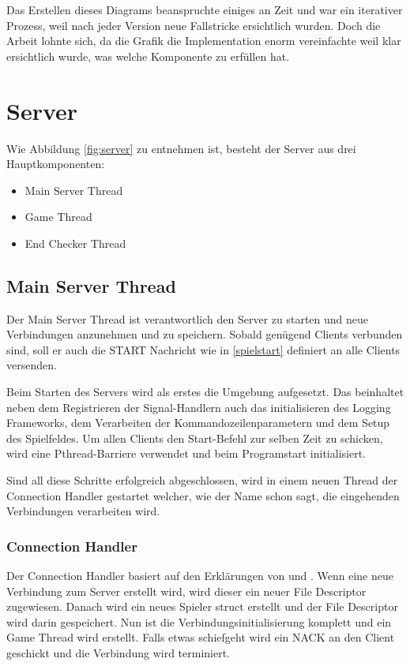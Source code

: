 Das Erstellen dieses Diagrams beanspruchte einiges an Zeit und war ein iterativer Prozess, weil nach jeder Version neue Fallstricke ersichtlich wurden. Doch die Arbeit lohnte sich, da die Grafik die Implementation enorm vereinfachte weil klar ersichtlich wurde, was welche Komponente zu erfüllen hat.

\section{Server}
Wie Abbildung \ref{fig:server} zu entnehmen ist, besteht der Server aus drei Hauptkomponenten:
\begin{itemize}
	\item Main Server Thread
	\item Game Thread
	\item End Checker Thread
\end{itemize}

\subsection{Main Server Thread}
Der Main Server Thread ist verantwortlich den Server zu starten und neue Verbindungen anzunehmen und zu speichern. Sobald genügend Clients verbunden sind, soll er auch die START Nachricht wie in \ref{spielstart} definiert an alle Clients versenden.

Beim Starten des Servers wird als erstes die Umgebung aufgesetzt. Das beinhaltet neben dem Registrieren der Signal-Handlern auch das initialisieren des Logging Frameworks, dem Verarbeiten der Kommandozeilenparametern und dem Setup des Spielfeldes. Um allen Clients den Start-Befehl zur selben Zeit zu schicken, wird eine Pthread-Barriere verwendet und beim Programstart initialisiert.

Sind all diese Schritte erfolgreich abgeschlossen, wird in einem neuen Thread der Connection Handler gestartet welcher, wie der Name schon sagt, die eingehenden Verbindungen verarbeiten wird.

\subsubsection{Connection Handler}
Der Connection Handler basiert auf den Erklärungen von \cite{byte-stream-server} und \cite{apue}. Wenn eine neue Verbindung zum Server erstellt wird, wird dieser ein neuer File Descriptor zugewiesen. 	Danach wird ein neues Spieler struct erstellt und der File Descriptor wird darin gespeichert. Nun ist die Verbindungsinitialisierung komplett und ein Game Thread wird erstellt. Falls etwas schiefgeht wird ein NACK an den Client geschickt und die Verbindung wird terminiert.

